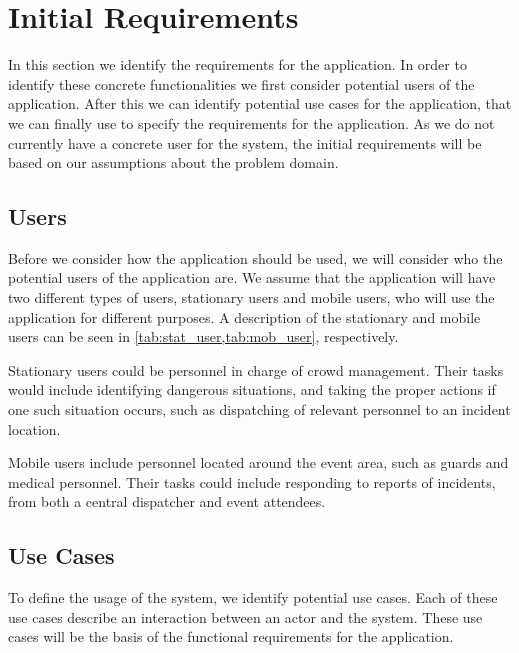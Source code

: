 \section{Initial Requirements}\label{sec:s1_requirements}
In this section we identify the requirements for the application. In order to identify these concrete functionalities we first consider potential users of the application. After this we can identify potential use cases for the application, that we can finally use to specify the requirements for the application. As we do not currently have a concrete user for the system, the initial requirements will be based on our assumptions about the problem domain. 

\subsection{Users} \label{ss:s1_users}
Before we consider how the application should be used, we will consider who the potential users of the application are. We assume that the application will have two different types of users, stationary users and mobile users, who will use the application for different purposes. A description of the stationary and mobile users can be seen in \cref{tab:stat_user,tab:mob_user}, respectively.

Stationary users could be personnel in charge of crowd management. Their tasks would include identifying dangerous situations, and taking the proper actions if one such situation occurs, such as dispatching of relevant personnel to an incident location.



Mobile users include personnel located around the event area, such as guards and medical personnel. Their tasks could include responding to reports of incidents, from both a central dispatcher and event attendees.



\subsection{Use Cases} \label{ss:s1_uc}
To define the usage of the system, we identify potential use cases. Each of these use cases describe an interaction between an actor and the system. These use cases will be the basis of the functional requirements for the application.

